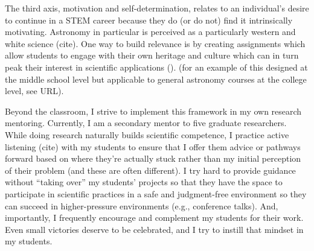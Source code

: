 \documentclass[11pt]{article}
\begin{document}
The third axis, motivation and self-determination, relates to an individual's desire to continue in a STEM career because they do (or do not) find it intrinsically motivating.
Astronomy in particular is perceived as a particularly western and white science (cite).
One way to build relevance is by creating assignments which allow students to engage with their own heritage and culture which can in turn peak their interest in scientific applications ().
(for an example of this designed at the middle school level but applicable to general astronomy courses at the college level, see URL).


Beyond the classroom, I strive to implement this framework in my own research mentoring. 
Currently, I am a secondary mentor to five graduate researchers.
While doing research naturally builds scientific competence, I practice active listening (cite) with my students to ensure that I offer them advice or pathways forward based on where they're actually stuck rather than my initial perception of their problem (and these are often different).
I try hard to provide guidance without “taking over” my students' projects so that they have the space to participate in scientific practices in a safe and judgment-free environment so they can succeed in higher-pressure environments (e.g., conference talks).
And, importantly, I frequently encourage and complement my students for their work. 
Even small victories deserve to be celebrated, and I try to instill that mindset in my students.
\end{document}
